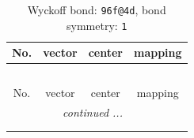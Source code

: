 \documentclass[fleqn,8pt]{jsarticle}
\begin{document}
\renewcommand{\arraystretch}{1.2}
\begin{longtable}{cccc}
\caption{Wyckoff bond: {\tt 96f@4d}, bond symmetry: {\tt 1}}
 \\
 \hline \hline
No. & vector & center & mapping \\ \hline \endfirsthead

\multicolumn{3}{l}{\tablename\ \thetable{}} \\
 \hline \hline
No. & vector & center & mapping \\ \hline \endhead

 \hline \hline
\multicolumn{3}{r}{\footnotesize\it continued ...} \\ \endfoot

 \hline \hline
\multicolumn{3}{r}{} \\ \endlastfoot


\end{longtable}
\end{document}
